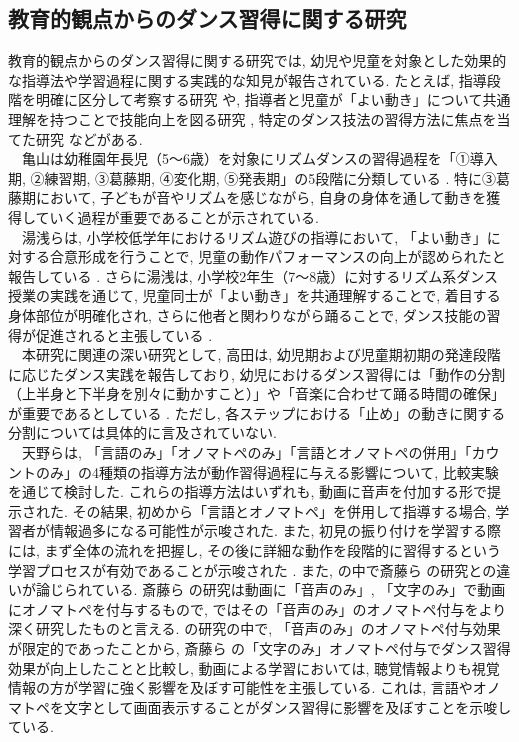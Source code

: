 \documentclass[paper]{ieicej}
\begin{document}
\subsection{教育的観点からのダンス習得に関する研究}
教育的観点からのダンス習得に関する研究では, 幼児や児童を対象とした効果的な指導法や学習過程に関する実践的な知見が報告されている. たとえば, 指導段階を明確に区分して考察する研究 \cite{ref10}や, 指導者と児童が「よい動き」について共通理解を持つことで技能向上を図る研究 \cite{ref11}, 特定のダンス技法の習得方法に焦点を当てた研究 \cite{ref12}などがある.\\
　亀山は幼稚園年長児（5～6歳）を対象にリズムダンスの習得過程を「①導入期, ②練習期, ③葛藤期, ④変化期, ⑤発表期」の5段階に分類している \cite{ref10}. 特に③葛藤期において, 子どもが音やリズムを感じながら, 自身の身体を通して動きを獲得していく過程が重要であることが示されている.\\
　湯浅らは, 小学校低学年におけるリズム遊びの指導において, 「よい動き」に対する合意形成を行うことで, 児童の動作パフォーマンスの向上が認められたと報告している \cite{ref11}. さらに湯浅は, 小学校2年生（7～8歳）に対するリズム系ダンス授業の実践を通じて, 児童同士が「よい動き」を共通理解することで, 着目する身体部位が明確化され, さらに他者と関わりながら踊ることで, ダンス技能の習得が促進されると主張している \cite{ref12}.\\
　本研究に関連の深い研究として, 高田は, 幼児期および児童期初期の発達段階に応じたダンス実践を報告しており, 幼児におけるダンス習得には「動作の分割（上半身と下半身を別々に動かすこと）」や「音楽に合わせて踊る時間の確保」が重要であるとしている \cite{ref13}. ただし, 各ステップにおける「止め」の動きに関する分割については具体的に言及されていない.\\
　天野らは, 「言語のみ」「オノマトペのみ」「言語とオノマトペの併用」「カウントのみ」の4種類の指導方法が動作習得過程に与える影響について, 比較実験を通じて検討した. これらの指導方法はいずれも, 動画に音声を付加する形で提示された. その結果, 初めから「言語とオノマトペ」を併用して指導する場合, 学習者が情報過多になる可能性が示唆された. また, 初見の振り付けを学習する際には, まず全体の流れを把握し, その後に詳細な動作を段階的に習得するという学習プロセスが有効であることが示唆された \cite{ref14}. また, \cite{ref14}の中で斎藤ら \cite{ref15}の研究との違いが論じられている. 斎藤ら \cite{ref15}の研究は動画に「音声のみ」, 「文字のみ」で動画にオノマトペを付与するもので, \cite{ref14}ではその「音声のみ」のオノマトペ付与をより深く研究したものと言える. \cite{ref14}の研究の中で, 「音声のみ」のオノマトペ付与効果が限定的であったことから, 斎藤ら \cite{ref15}の「文字のみ」オノマトペ付与でダンス習得効果が向上したことと比較し, 動画による学習においては, 聴覚情報よりも視覚情報の方が学習に強く影響を及ぼす可能性を主張している. これは, 言語やオノマトペを文字として画面表示することがダンス習得に影響を及ぼすことを示唆している. \\
\end{document}
